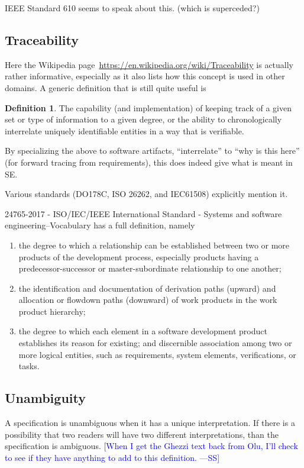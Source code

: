 \documentclass[letterpaper,cleveref]{lipics-v2019}
\newcommand{\authornote}[3]{\textcolor{#1}{[#3 ---#2]}}
\newcommand{\authornote}[3]{}
\newcommand{\wss}[1]{\authornote{blue}{SS}{#1}} %
\theoremstyle{definition}
\newtheorem{defn}{Definition}
\begin{document}
IEEE Standard 610 seems to speak about this. (which is superceded?)

\subsection{Traceability}

Here the Wikipedia page~\url{https://en.wikipedia.org/wiki/Traceability} is actually
rather informative, especially as it also lists how this concept is used in other domains.
A generic definition that is still quite useful is
\begin{defn}
The capability (and implementation) of keeping track of a given set or type of
information to a given degree, or the ability to chronologically interrelate
uniquely identifiable entities in a way that is verifiable.
\end{defn}
By specializing the above to software artifacts, ``interrelate'' to 
``why is this here'' (for forward tracing from requirements), this does
indeed give what is meant in SE.

Various standards (DO178C, ISO 26262, and IEC61508) explicitly mention it.

24765-2017 - ISO/IEC/IEEE International Standard - Systems and software engineering--Vocabulary
has a full definition, namely
\begin{enumerate}
\item the degree to which a relationship can be established between two or more
products of the development process, especially products having a
predecessor-successor or master-subordinate relationship to one another;
\item
the identification and documentation of derivation paths (upward) and
allocation or flowdown paths (downward) of work products in the work product
hierarchy;
\item the degree to which each element in a software development
product establishes its reason for existing; and discernible association
among two or more logical entities, such as requirements, system elements,
verifications, or tasks.
\end{enumerate}

\subsection{Unambiguity}

A specification is unambiguous when it has a unique interpretation.  If there is
a possibility that two readers will have two different interpretations, than the
specification is ambiguous.  \wss{When I get the Ghezzi text back from Olu, I'll
  check to see if they have anything to add to this definition.}
\end{document}
